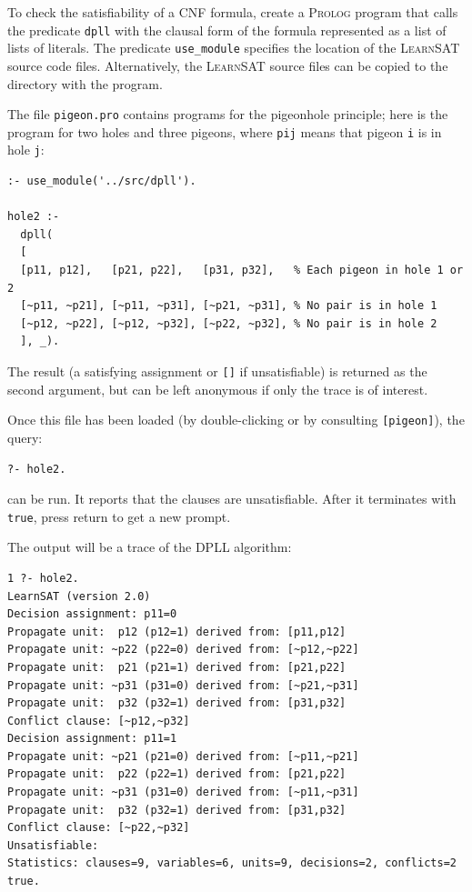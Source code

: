 \documentclass[11pt]{article}
\newcommand*{\p}[1]{\textup{\texttt{#1}}}
\newcommand*{\ls}{\textsc{LearnSAT}}
\newcommand*{\pl}{\textsc{Prolog}}
\begin{document}
To check the satisfiability of a CNF formula, create a \pl{} program
that calls the predicate \p{dpll} with the clausal form of the formula
represented as a list of lists of literals. The predicate \p{use\_module} specifies the location of the \ls{} source code files. Alternatively, the \ls{} source files can be copied to the directory with the program.

The file \p{pigeon.pro} contains programs for the pigeonhole principle; here is the program for two holes and three pigeons, where \p{pij} means that pigeon \p{i} is in hole \p{j}:

\begin{verbatim}
:- use_module('../src/dpll').

hole2 :-
  dpll(
  [
  [p11, p12],   [p21, p22],   [p31, p32],   % Each pigeon in hole 1 or 2 
  [~p11, ~p21], [~p11, ~p31], [~p21, ~p31], % No pair is in hole 1
  [~p12, ~p22], [~p12, ~p32], [~p22, ~p32], % No pair is in hole 2
  ], _).
\end{verbatim}

The result (a satisfying assignment or \p{[]} if unsatisfiable) is
returned as the second argument, but can be left anonymous if only
the trace is of interest.

Once this file has been loaded (by double-clicking or by consulting
\p{[pigeon]}), the query:
\begin{verbatim}
?- hole2. 
\end{verbatim}
can be run. It reports that the clauses are unsatisfiable. After it terminates with \p{true}, press return to get a new prompt.

The output will be a trace of the DPLL algorithm:

\begin{verbatim}
1 ?- hole2.
LearnSAT (version 2.0)
Decision assignment: p11=0
Propagate unit:  p12 (p12=1) derived from: [p11,p12]
Propagate unit: ~p22 (p22=0) derived from: [~p12,~p22]
Propagate unit:  p21 (p21=1) derived from: [p21,p22]
Propagate unit: ~p31 (p31=0) derived from: [~p21,~p31]
Propagate unit:  p32 (p32=1) derived from: [p31,p32]
Conflict clause: [~p12,~p32]
Decision assignment: p11=1
Propagate unit: ~p21 (p21=0) derived from: [~p11,~p21]
Propagate unit:  p22 (p22=1) derived from: [p21,p22]
Propagate unit: ~p31 (p31=0) derived from: [~p11,~p31]
Propagate unit:  p32 (p32=1) derived from: [p31,p32]
Conflict clause: [~p22,~p32]
Unsatisfiable:
Statistics: clauses=9, variables=6, units=9, decisions=2, conflicts=2
true.
\end{verbatim}
\end{document}
